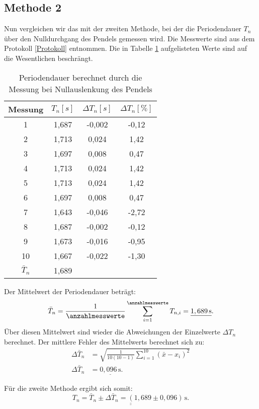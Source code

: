 \subsection*{Methode 2}
Nun vergleichen wir das mit der zweiten Methode, bei der die Periodendauer $T_{n}$ über den Nulldurchgang des Pendels gemessen wird. Die Messwerte sind aus dem Protokoll \ref{Protokoll} entnommen. Die in Tabelle \ref{tab:null_Auslenkung} aufgelisteten Werte sind auf die Wesentlichen beschrängt.
\begin{table}[h!]
\centering

\begin{tabular}{c|c|c|c}
Messung & $T_{n} [s]$ & $\Delta T_{n} [s]$ & $\Delta T_{n} [\%]$ \\
\hline
1 & 1,687 & -0,002 & -0,12 \\
2 & 1,713 & 0,024 & 1,42 \\
3 & 1,697 & 0,008 & 0,47 \\
4 & 1,713 & 0,024 & 1,42 \\
5 & 1,713 & 0,024 & 1,42 \\
6 & 1,697 & 0,008 & 0,47 \\
7 & 1,643 & -0,046 & -2,72 \\
8 & 1,687 & -0,002 & -0,12 \\
9 & 1,673 & -0,016 & -0,95 \\
10 & 1,667 & -0,022 & -1,30 \\
\hline
$\bar{T}_{n}$ & 1,689 & & \\
\end{tabular}
\caption{Periodendauer berechnet durch die Messung bei Nullauslenkung des Pendels}
\label{tab:null_Auslenkung}
\end{table}

Der Mittelwert der Periodendauer beträgt:
\begin{equation}
    \bar{T}_{n} = \frac{1}{\anzahlmesswerte}\sum_{i=1}^{\anzahlmesswerte} T_{n,i} = \underline{1,689\,\mathrm{s}}.
\end{equation}
Über diesen Mittelwert sind wieder die Abweichungen der Einzelwerte $\Delta T_{n}$ berechnet.
Der mittlere Fehler des Mittelwerts berechnet sich zu:
\begin{align}
    \Delta \bar{T}_{n} & = \sqrt{\frac{1}{10(10-1)} \sum_{i=1}^{10} (\bar{x}-x_i)^2} \\
    \Delta \bar{T}_{n} & = \underline{0,096\,\mathrm{s}}.
\end{align}

Für die zweite Methode ergibt sich somit:
\begin{equation}
    \underline{\underline{T_{n} = \bar{T}_{n} \pm \Delta \bar{T}_{n} = (1,689 \pm 0,096)\,\mathrm{s}.}} 
\end{equation}

